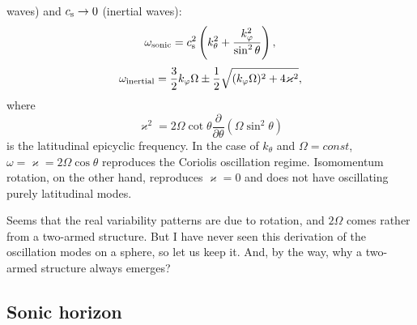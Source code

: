 \documentclass[usenatbib,onecolumn]{mnras}
\newcommand{\alert}[1]{\color{red} #1\color{black}}
\newcommand{\ppardir}[2]{\ensuremath{\frac{\partial }{\partial #1} \left( #2\right)}}
\newcommand{\cs}{\ensuremath{c_{\rm s}}}
\begin{document}
waves) and $\cs \to 0$ (inertial waves):
\begin{equation}\label{E:WKB:sonic}
 \displaystyle  \omega_{\rm sonic} = \cs^2 \left( k_\theta^2 + \frac{k_\varphi^2}{\sin^2\theta}\right),
\end{equation}
\begin{equation}\label{E:WKB:inertial}
\displaystyle   \omega_{\rm inertial} = \frac{3}{2}k_\varphi \Omega \pm
  \frac{1}{2}\sqrt{(k_\varphi \Omega)^2 + 4\varkappa^2},
\end{equation}
where
\begin{equation}\label{E:WKB:varkappa}
  \varkappa^2 = 2\Omega \cot\theta \ppardir{\theta}{\Omega \sin^2\theta}
\end{equation}
is the latitudinal epicyclic frequency. In the case of
$k_\theta$ and $\Omega=const$, $\omega = \varkappa = 2\Omega \cos\theta$
reproduces the Coriolis oscillation regime. Isomomentum rotation, on the other
hand, reproduces $\varkappa = 0$ and does not have oscillating purely latitudinal
modes.

\alert{Seems that the real variability patterns are due to rotation, and
  $2\Omega$ comes rather from a two-armed structure. But I have never seen
  this derivation of the oscillation  modes on a sphere, so let us keep
  it. And, by the way, why a two-armed structure always emerges?}

\subsection{Sonic horizon}




\label{lastpage}
\end{document}
